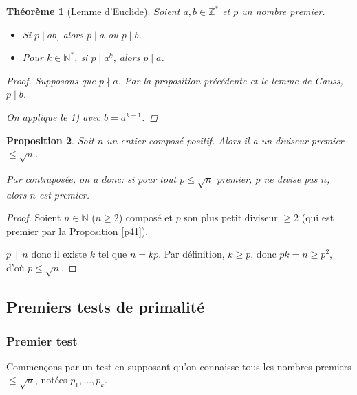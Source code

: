 \documentclass[10pt,a4paper]{report}
\newtheorem{thm}{Théorème}[chapter]
\newtheorem{Prop}[thm]{Proposition}
\begin{document}
\begin{thm}[Lemme d'Euclide]
Soient $a,b \in \mathbb{Z}^*$ et $p$ un nombre premier.
\begin{itemize}
\item[$1)$] Si $p \mid ab$, alors $p\mid a$ ou $p\mid b$.
\item[$2)$] Pour $k \in \mathbb{N}^*$, si $p \mid a^k$, alors $p\mid a$.
\end{itemize}

\begin{proof}
\item[$1)$] Supposons que $p \nmid a$. Par la proposition précédente et le lemme de Gauss, $p \mid b$.
\item[$2)$] On applique le 1) avec $b=a^{k-1}$.
\end{proof}

\end{thm}




\begin{Prop}
Soit $n$ un entier composé positif. Alors il a un diviseur premier $\leqslant \sqrt{n}$.\par 
Par contraposée, on a donc: si pour tout $p \leqslant \sqrt{n}$ premier, $p$ ne divise pas $n$, alors $n$ est premier.
\end{Prop}

\begin{proof}
Soient $n \in \mathbb{N}$ ($n \geqslant 2$) composé et $p$ son plus petit diviseur $\geqslant 2$ (qui est premier par la Proposition \ref{p41}). \par 
$p \, \mid \,  n$ donc il existe $k$ tel que $n=kp$. Par définition, $k \geqslant p$, donc $pk=n \geqslant p^2$, d'où $p \leqslant \sqrt{n}$.  
\end{proof}



\subsection*{Premiers tests de primalité}

\subsubsection*{Premier test}

Commençons par un test en supposant qu'on connaisse tous les nombres premiers $\leqslant \sqrt{n}$, notées $p_1, \ldots , p_k $. \\
\end{document}
